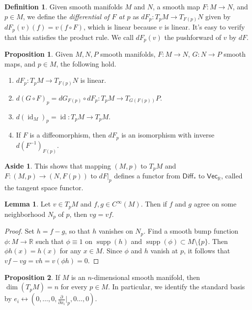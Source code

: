 \documentclass[10pt,letterpaper,cm]{nupset}
\theoremstyle{definition}
\newtheorem*{definition}{Definition}
\newtheorem{lemma}{Lemma}
\newtheorem*{aside}{Aside}
\newtheorem{prop}{Proposition}
\newcommand{\R}{\mathbb R}
\newcommand{\1}{\mathbf{1}}
\newcommand{\0}{\vec 0}
\DeclareMathOperator{\id}{id}
\DeclareMathOperator{\supp}{supp}
\begin{document}
\begin{definition}
Given smooth manifolds $M$ and $N$, a smooth map $F: M \to N$, and $p\in M$,  we define the \textit{differential of $F$ at $p$} as $dF_p: T_pM \to T_{F(p)}N$ given by $dF_p(v)(f) = v(f \circ F)$, which is linear because $v$ is linear. It's easy to verify that this satisfies the product rule. We call $dF_p(v)$ the pushforward of $v$ by $dF$.
\end{definition}

\begin{prop}
Given $M, N, P$ smooth manifolds, $F: M \to N$, $G: N \to P$ smooth maps, and $p\in M$, the following hold. 
\begin{enumerate}
\item $dF_p: T_pM \to T_{F(p)}N$ is linear. 
\item $d(G \circ F)_p = dG_{F(p)} \circ dF_p : T_pM \to T_{G(F(p))}P$.
\item $d(\id_M)_p = \id : T_pM \to T_pM$.
\item If $F$ is a diffeomorphism, then $dF_p$ is an isomorphism with inverse $d(F^{-1})_{F(p)}$.
\end{enumerate}
\end{prop}

\begin{aside}
This shows that mapping $(M, p)$ to $T_pM$ and $F: (M, p) \to(N, F(p))$ to $dF\vert_p$ defines a functor from $\mathsf{Diff}_{\ast}$ to $\mathsf{Vec}_{\R}$, called the tangent space functor.
\end{aside}

\begin{lemma}
Let $v \in T_pM$ and $f, g\in C^{\infty}(M)$. Then if $f$ and $g$ agree on some neighborhood $N_p$ of $p$, then $vg = vf$. 
\end{lemma}
\begin{proof}
Set $h = f-g$, so that $h$ vanishes on $N_p$. Find a smooth bump function $\phi: M \to \R$ such that $\phi \equiv 1$ on $\supp(h)$ and $\supp(\phi) \subset M \setminus \{p\}$. Then $\phi h(x) = h(x)$ for any $x\in M$. Since $\phi$ and $h$ vanish at $p$, it follows that $vf -vg = vh = v(\phi h) = 0.$
\end{proof}

\begin{prop}
If $M$ is an $n$-dimensional smooth manifold, then $\dim(T_pM) =n$ for every $p\in M$. In particular, we identify the standard basis by $e_i \leftrightarrow (0, \ldots, 0, \frac{\partial}{\partial{x_i}}\rvert_p, 0 \ldots, 0)$.
\end{prop}
\end{document}

